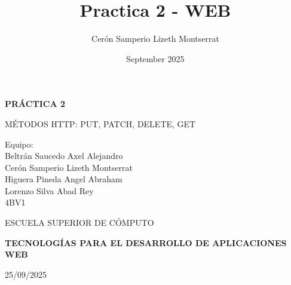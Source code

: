 \documentclass[12pt]{article}
\title{Practica 2 - WEB}
\author{Cerón Samperio Lizeth Montserrat}
\date{September 2025}
\begin{document}

\begin{titlepage}
    \thispagestyle{empty}
    
    
    \begin{spacing}{1.5}
        {\Huge \bfseries \noindent PRÁCTICA 2}
        \vspace{10pt}

        {\LARGE MÉTODOS HTTP: PUT, PATCH, DELETE, GET}
        
        \vspace{1cm}
        
        {\Large Equipo:} \\
        {\Large Beltrán Saucedo Axel Alejandro} \\
        {\Large Cerón Samperio Lizeth Montserrat} \\
        {\Large Higuera Pineda Angel Abraham} \\
        {\Large Lorenzo Silva Abad Rey} \\
        {\Large 4BV1}
    \end{spacing}
    
    \vspace{1.5cm}

    \begin{minipage}{7.5cm} %
        {\Large ESCUELA SUPERIOR DE CÓMPUTO}
    \end{minipage}

    \vfill %

    \begin{flushleft}
        {\Large \color{black}
        \textbf{TECNOLOGÍAS PARA EL DESARROLLO DE APLICACIONES WEB}}
        
        \vspace{0.5cm}
        
        25/09/2025
    \end{flushleft}
    \vspace{1cm}
\end{titlepage}
\end{document}
